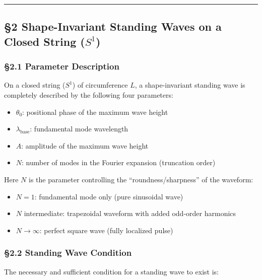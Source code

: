 \documentclass[
  a4paper,11pt]{article}
\providecommand{\tightlist}{%
  \setlength{\itemsep}{0pt}\setlength{\parskip}{0pt}}
\theoremstyle{definition}
\theoremstyle{remark}
\begin{document}
\begin{center}\rule{0.5\linewidth}{0.5pt}\end{center}

\subsection{\texorpdfstring{§2 Shape-Invariant Standing Waves on a
Closed String
(\(S^1\))}{§2 Shape-Invariant Standing Waves on a Closed String (S\^{}1)}}\label{shape-invariant-standing-waves-on-a-closed-string-s1}

\subsubsection{§2.1 Parameter Description}\label{parameter-description}

On a closed string (\(S^1\)) of circumference \(L\), a shape-invariant
standing wave is completely described by the following four parameters:

\begin{itemize}
\tightlist
\item
  \(\theta_0\): positional phase of the maximum wave height
\item
  \(\lambda_{\text{base}}\): fundamental mode wavelength
\item
  \(A\): amplitude of the maximum wave height
\item
  \(N\): number of modes in the Fourier expansion (truncation order)
\end{itemize}

Here \(N\) is the parameter controlling the ``roundness/sharpness'' of
the waveform:

\begin{itemize}
\tightlist
\item
  \(N = 1\): fundamental mode only (pure sinusoidal wave)
\item
  \(N\) intermediate: trapezoidal waveform with added odd-order
  harmonics
\item
  \(N \to \infty\): perfect square wave (fully localized pulse)
\end{itemize}

\subsubsection{§2.2 Standing Wave
Condition}\label{standing-wave-condition}

The necessary and sufficient condition for a standing wave to exist is:
\end{document}

